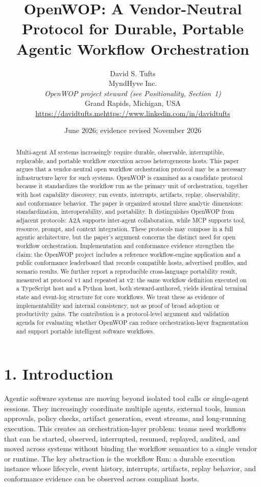 \documentclass[11pt]{article}
\title{OpenWOP: A Vendor-Neutral Protocol for Durable, Portable Agentic Workflow Orchestration}
\author{David S. Tufts\\
MyndHyve Inc.\\
\emph{\small OpenWOP project steward (see Positionality, Section~1)}\\
Grand Rapids, Michigan, USA\\
\url{https://davidtufts.me}\quad\url{https://www.linkedin.com/in/davidtufts}}
\date{June 2026; evidence revised November 2026}
\begin{document}
\maketitle

\begin{abstract}
Multi-agent AI systems increasingly require durable, observable, interruptible, replayable, and portable workflow execution across heterogeneous hosts. This paper argues that a vendor-neutral open workflow orchestration protocol may be a necessary infrastructure layer for such systems. OpenWOP is examined as a candidate protocol because it standardizes the workflow run as the primary unit of orchestration, together with host capability discovery, run events, interrupts, artifacts, replay, observability, and conformance behavior. The paper is organized around three analytic dimensions: standardization, interoperability, and portability. It distinguishes OpenWOP from adjacent protocols: A2A supports inter-agent collaboration, while MCP supports tool, resource, prompt, and context integration. These protocols may compose in a full agentic architecture, but the paper's argument concerns the distinct need for open workflow orchestration. Implementation and conformance evidence strengthen the claim: the OpenWOP project includes a reference workflow-engine application and a public conformance leaderboard that records compatible hosts, advertised profiles, and scenario results. We further report a reproducible cross-language portability result, measured at protocol v1 and repeated at v2: the same workflow definition executed on a TypeScript host and a Python host, both steward-authored, yields identical terminal state and event-log structure for core workflows. We treat these as evidence of implementability and internal consistency, not as proof of broad adoption or productivity gains. The contribution is a protocol-level argument and validation agenda for evaluating whether OpenWOP can reduce orchestration-layer fragmentation and support portable intelligent software workflows.
\end{abstract}
\section*{1. Introduction}
Agentic software systems are moving beyond isolated tool calls or single-agent sessions. They increasingly coordinate multiple agents, external tools, human approvals, policy checks, artifact generation, event streams, and long-running execution. This creates an orchestration-layer problem: teams need workflows that can be started, observed, interrupted, resumed, replayed, audited, and moved across systems without binding the workflow semantics to a single vendor or runtime. The key abstraction is the workflow Run: a durable execution instance whose lifecycle, event history, interrupts, artifacts, replay behavior, and conformance evidence can be observed across compliant hosts.
\end{document}
